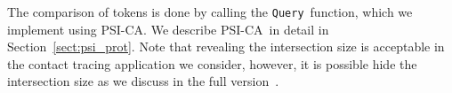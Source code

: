 \documentclass[11pt]{article} %
\newcommand{\sectionref}[1]{Section~\ref{#1}}
\newcommand{\tpsi}{$t$-PSI\xspace}
\newcommand{\psica}{PSI-CA\xspace}
\newcommand{\ctquery}{\texttt{Query}}
\newcommand{\sT}{\mathbf{T}}
\newcommand{\remove}[1]{}
\begin{document}
The comparison of tokens is done by calling the \ctquery\ function, which we implement using \psica. We describe \psica\ in detail in \sectionref{sect:psi_prot}. Note that revealing the intersection size is acceptable in the contact tracing application we consider, however, it is possible hide the intersection size as we discuss in the full version~\cite{epione}.

\remove{	
	\begin{figure}[ht!]
		\centering
		\noindent\fcolorbox{black}{gray!20}{%
			\begin{minipage}{0.95\linewidth}
				{\sc Parameters:}
				Two parties: server and user; and upper bound on the input size of each party.
				
				
				{\sc Functionality:}
				\begin{itemize}[noitemsep,topsep=0pt]
					\item Wait for input set $\widehat{\sT}_S$  from the server
					\item Wait for input set $\sT_{R,u_i}$ from the user
					\item Give nothing to the server 
					\item Give the user a bit indicated whether $|T_i \cap \sT|>0$		
				\end{itemize}
			\end{minipage}
		}
		\caption{Our \tpsi Gadget.}
		\label{fig:tpsi-func}	
	\end{figure}
}
\end{document}

